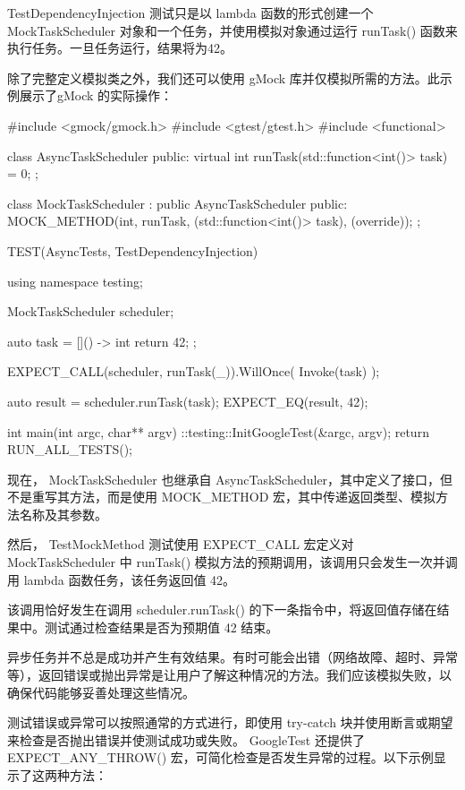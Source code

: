 TestDependencyInjection 测试只是以 lambda 函数的形式创建一个 MockTaskScheduler 对象和一个任务，并使用模拟对象通过运行 runTask() 函数来执行任务。一旦任务运行，结果将为42。

除了完整定义模拟类之外，我们还可以使用 gMock 库并仅模拟所需的方法。此示例展示了gMock 的实际操作：

\begin{cpp}
#include <gmock/gmock.h>
#include <gtest/gtest.h>
#include <functional>

class AsyncTaskScheduler {
    public:
    virtual int runTask(std::function<int()> task) = 0;
};

class MockTaskScheduler : public AsyncTaskScheduler {
    public:
    MOCK_METHOD(int, runTask, (std::function<int()> task), (override));
};

TEST(AsyncTests, TestDependencyInjection) {
    using namespace testing;

    MockTaskScheduler scheduler;

    auto task = []() -> int {
        return 42;
    };

    EXPECT_CALL(scheduler, runTask(_)).WillOnce(
        Invoke(task)
    );

    auto result = scheduler.runTask(task);
    EXPECT_EQ(result, 42);
}

int main(int argc, char** argv) {
    ::testing::InitGoogleTest(&argc, argv);
    return RUN_ALL_TESTS();
}
\end{cpp}

现在， MockTaskScheduler 也继承自 AsyncTaskScheduler，其中定义了接口，但不是重写其方法，而是使用 MOCK\_METHOD 宏，其中传递返回类型、模拟方法名称及其参数。

然后， TestMockMethod 测试使用 EXPECT\_CALL 宏定义对 MockTaskScheduler 中 runTask() 模拟方法的预期调用，该调用只会发生一次并调用 lambda 函数任务，该任务返回值 42。

该调用恰好发生在调用 scheduler.runTask() 的下一条指令中，将返回值存储在结果中。测试通过检查结果是否为预期值 42 结束。


异步任务并不总是成功并产生有效结果。有时可能会出错（网络故障、超时、异常等），返回错误或抛出异常是让用户了解这种情况的方法。我们应该模拟失败，以确保代码能够妥善处理这些情况。

测试错误或异常可以按照通常的方式进行，即使用 try-catch 块并使用断言或期望来检查是否抛出错误并使测试成功或失败。 GoogleTest 还提供了 EXPECT\_ANY\_THROW() 宏，可简化检查是否发生异常的过程。以下示例显示了这两种方法：

